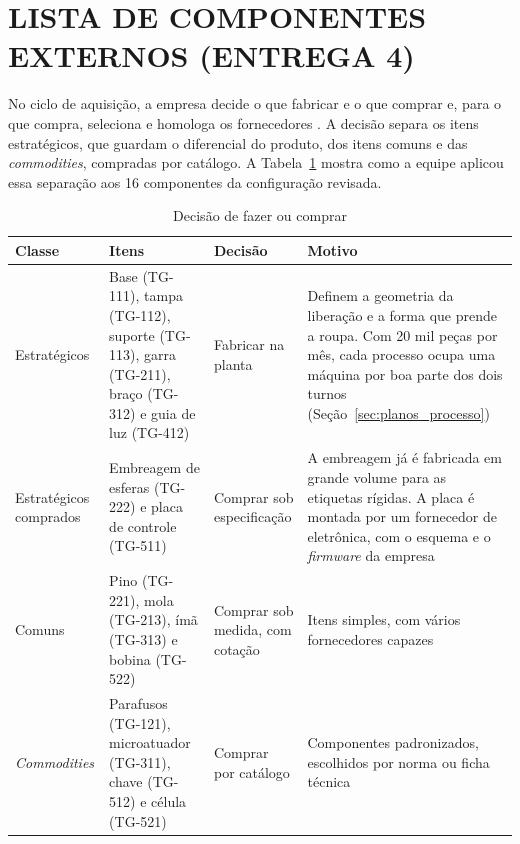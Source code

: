 \section{LISTA DE COMPONENTES EXTERNOS (ENTREGA 4)}\label{sec:componentes_externos}

No ciclo de aquisição, a empresa decide o que fabricar e o que comprar e, para o que compra, seleciona e homologa os fornecedores \cite{rozenfeld2006gestao}. A decisão separa os itens estratégicos, que guardam o diferencial do produto, dos itens comuns e das \textit{commodities}, compradas por catálogo. A Tabela~\ref{tab:ext_decisao} mostra como a equipe aplicou essa separação aos 16 componentes da configuração revisada.

\begin{table}[htbp]
    \centering
    \caption{Decisão de fazer ou comprar}
    \label{tab:ext_decisao}
    \footnotesize
    \renewcommand{\arraystretch}{1.3}
    \begin{tabularx}{\textwidth}{@{}
        >{\RaggedRight\arraybackslash}p{2.3cm}
        >{\RaggedRight\arraybackslash}p{4.4cm}
        >{\RaggedRight\arraybackslash}p{2.7cm}
        >{\RaggedRight\arraybackslash}X@{}}
        \toprule
        \textbf{Classe} & \textbf{Itens} & \textbf{Decisão} & \textbf{Motivo} \\
        \midrule
        Estratégicos & Base (TG-111), tampa (TG-112), suporte (TG-113), garra (TG-211), braço (TG-312) e guia de luz (TG-412) & Fabricar na planta & Definem a geometria da liberação e a forma que prende a roupa. Com 20 mil peças por mês, cada processo ocupa uma máquina por boa parte dos dois turnos (Seção~\ref{sec:planos_processo}) \\
        Estratégicos comprados & Embreagem de esferas (TG-222) e placa de controle (TG-511) & Comprar sob especificação & A embreagem já é fabricada em grande volume para as etiquetas rígidas. A placa é montada por um fornecedor de eletrônica, com o esquema e o \textit{firmware} da empresa \\
        Comuns & Pino (TG-221), mola (TG-213), ímã (TG-313) e bobina (TG-522) & Comprar sob medida, com cotação & Itens simples, com vários fornecedores capazes \\
        \textit{Commodities} & Parafusos (TG-121), microatuador (TG-311), chave (TG-512) e célula (TG-521) & Comprar por catálogo & Componentes padronizados, escolhidos por norma ou ficha técnica \\
        \bottomrule
    \end{tabularx}
\end{table}


